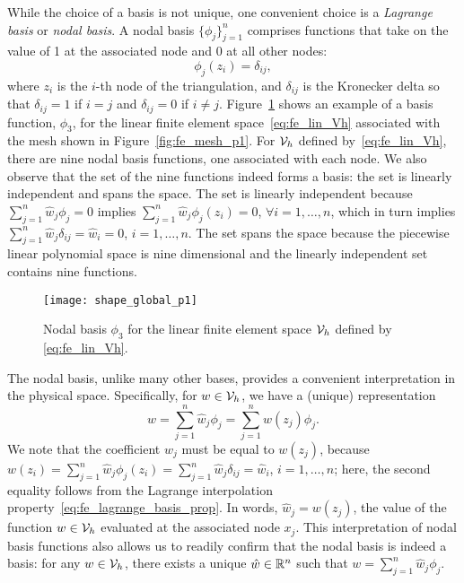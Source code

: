 While the choice of a basis is not unique, one convenient choice is a \emph{Lagrange basis} or \emph{nodal basis}.  A nodal basis $\{ \phi_j \}_{j=1}^n$ comprises functions that take on the value of 1 at the associated node and 0 at all other nodes:
\begin{equation}
  \phi_j(z_i) = \delta_{ij},
  \label{eq:fe_lagrange_basis_prop}
\end{equation}
where $z_i$ is the $i$-th node of the triangulation, and $\delta_{ij}$ is the Kronecker delta so that $\delta_{ij} = 1$ if $i = j$ and $\delta_{ij} = 0$ if $i \neq j$. Figure~\ref{fig:fe_shape_global_p1} shows an example of a basis function, $\phi_3$, for the linear finite element space~\eqref{eq:fe_lin_Vh} associated with the mesh shown in Figure~\ref{fig:fe_mesh_p1}.  For $\mathcal{V}_h$ defined by~\eqref{eq:fe_lin_Vh}, there are nine nodal basis functions, one associated with each node.  We also observe that the set of the nine functions indeed forms a basis: the set is linearly independent and spans the space. The set is linearly independent because $\sum_{j=1}^n \hat w_j \phi_j = 0$ implies $\sum_{j=1}^n \hat w_j \phi_j(z_i) = 0$, $\forall i =1,\dots,n$, which in turn implies $\sum_{j=1}^n \hat w_j \delta_{ij} = \hat w_i = 0$, $i = 1,\dots,n$.  The set spans the space because the piecewise linear polynomial space is nine dimensional and the linearly independent set contains nine functions.

\begin{figure}
  \centering
  \texttt{[image: shape\_global\_p1]}
  \caption{Nodal basis $\phi_3$ for the linear finite element space $\mathcal{V}_h$ defined by \eqref{eq:fe_lin_Vh}.}
  \label{fig:fe_shape_global_p1}
\end{figure}

The nodal basis, unlike many other bases, provides a convenient interpretation in the physical space.  Specifically, for $w \in \mathcal{V}_h$, we have a (unique) representation
\begin{equation}
  w = \sum_{j=1}^n \hat w_j \phi_j = \sum_{j=1}^n w(z_j) \phi_j.
  \label{eq:fe_rep}
\end{equation}
We note that the coefficient $\hat w_j$ must be equal to $w(z_j)$, because $w(z_i) = \sum_{j=1}^n \hat w_j \phi_j(z_i) = \sum_{j=1}^n \hat w_j \delta_{ij} = \hat w_i$, $i = 1,\dots,n$; here, the second equality follows from the Lagrange interpolation property~\eqref{eq:fe_lagrange_basis_prop}.  In words, $\hat w_j = w(z_j)$, the value of the function $w \in \mathcal{V}_h$ evaluated at the associated node $x_j$. This interpretation of nodal basis functions also allows us to readily confirm that the nodal basis is indeed a basis: for any $w \in \mathcal{V}_h$, there exists a unique $\hat w \in \mathbb{R}^n$ such that $w = \sum_{j=1}^n \hat w_j \phi_j$. %

